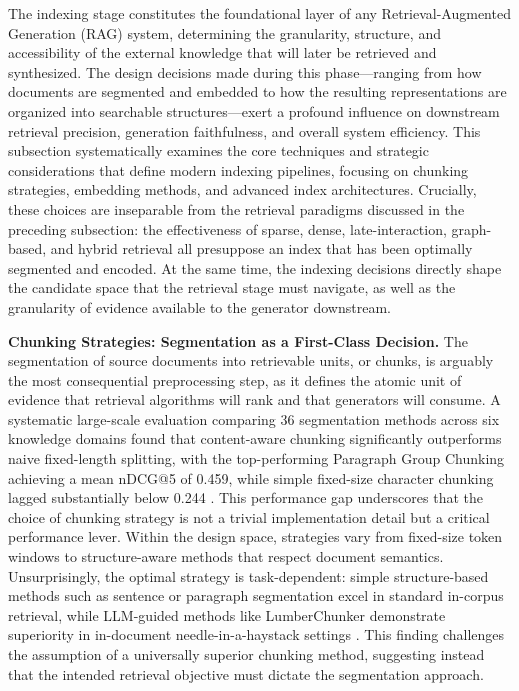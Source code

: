 \documentclass[11pt]{article}
\begin{document}
The indexing stage constitutes the foundational layer of any Retrieval-Augmented Generation (RAG) system, determining the granularity, structure, and accessibility of the external knowledge that will later be retrieved and synthesized. The design decisions made during this phase---ranging from how documents are segmented and embedded to how the resulting representations are organized into searchable structures---exert a profound influence on downstream retrieval precision, generation faithfulness, and overall system efficiency. This subsection systematically examines the core techniques and strategic considerations that define modern indexing pipelines, focusing on chunking strategies, embedding methods, and advanced index architectures. Crucially, these choices are inseparable from the retrieval paradigms discussed in the preceding subsection: the effectiveness of sparse, dense, late-interaction, graph-based, and hybrid retrieval all presuppose an index that has been optimally segmented and encoded. At the same time, the indexing decisions directly shape the candidate space that the retrieval stage must navigate, as well as the granularity of evidence available to the generator downstream.

\textbf{Chunking Strategies: Segmentation as a First-Class Decision.} The segmentation of source documents into retrievable units, or chunks, is arguably the most consequential preprocessing step, as it defines the atomic unit of evidence that retrieval algorithms will rank and that generators will consume. A systematic large-scale evaluation comparing 36 segmentation methods across six knowledge domains found that content-aware chunking significantly outperforms naive fixed-length splitting, with the top-performing Paragraph Group Chunking achieving a mean nDCG@5 of 0.459, while simple fixed-size character chunking lagged substantially below 0.244 \cite{ref80}. This performance gap underscores that the choice of chunking strategy is not a trivial implementation detail but a critical performance lever. Within the design space, strategies vary from fixed-size token windows to structure-aware methods that respect document semantics. Unsurprisingly, the optimal strategy is task-dependent: simple structure-based methods such as sentence or paragraph segmentation excel in standard in-corpus retrieval, while LLM-guided methods like LumberChunker demonstrate superiority in in-document needle-in-a-haystack settings \cite{ref81}. This finding challenges the assumption of a universally superior chunking method, suggesting instead that the intended retrieval objective must dictate the segmentation approach.
\end{document}
